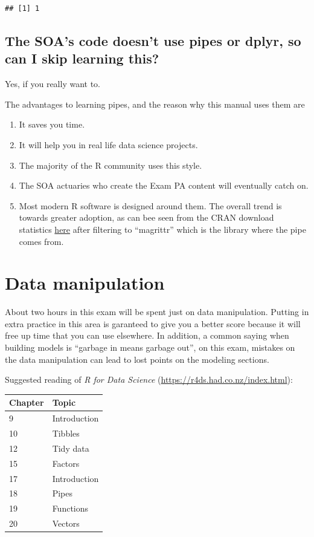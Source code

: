 \documentclass[openany]{book}
\providecommand{\tightlist}{%
  \setlength{\itemsep}{0pt}\setlength{\parskip}{0pt}}
\begin{document}
\begin{verbatim}
## [1] 1
\end{verbatim}

\hypertarget{the-soas-code-doesnt-use-pipes-or-dplyr-so-can-i-skip-learning-this}{%
\section{The SOA's code doesn't use pipes or dplyr, so can I skip learning this?}\label{the-soas-code-doesnt-use-pipes-or-dplyr-so-can-i-skip-learning-this}}

Yes, if you really want to.

The advantages to learning pipes, and the reason why this manual uses them are

\begin{enumerate}
\def\labelenumi{\arabic{enumi})}
\tightlist
\item
  It saves you time.
\item
  It will help you in real life data science projects.
\item
  The majority of the R community uses this style.
\item
  The SOA actuaries who create the Exam PA content will eventually catch on.
\item
  Most modern R software is designed around them. The overall trend is towards greater adoption, as can bee seen from the CRAN download statistics \href{https://hadley.shinyapps.io/cran-downloads/}{here} after filtering to ``magrittr'' which is the library where the pipe comes from.
\end{enumerate}

\hypertarget{data-manipulation}{%
\chapter{Data manipulation}\label{data-manipulation}}

About two hours in this exam will be spent just on data manipulation. Putting in extra practice in this area is garanteed to give you a better score because it will free up time that you can use elsewhere. In addition, a common saying when building models is ``garbage in means garbage out'', on this exam, mistakes on the data manipulation can lead to lost points on the modeling sections.

Suggested reading of \emph{R for Data Science} (\url{https://r4ds.had.co.nz/index.html}):

\begin{longtable}[]{@{}ll@{}}
\toprule
Chapter & Topic\tabularnewline
\midrule
\endhead
9 & Introduction\tabularnewline
10 & Tibbles\tabularnewline
12 & Tidy data\tabularnewline
15 & Factors\tabularnewline
17 & Introduction\tabularnewline
18 & Pipes\tabularnewline
19 & Functions\tabularnewline
20 & Vectors\tabularnewline
\bottomrule
\end{longtable}
\end{document}
